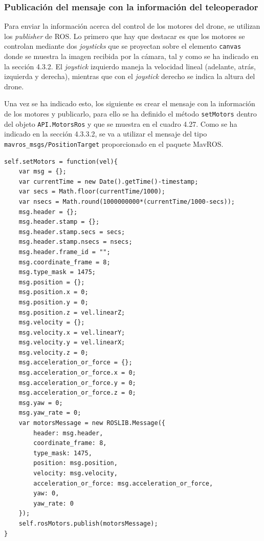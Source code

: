 \subsubsection{Publicación del mensaje con la información del teleoperador}

Para enviar la información acerca del control de los motores del drone, se utilizan los \textit{publisher} de ROS. Lo primero que hay que destacar es que los motores se controlan mediante dos \textit{joysticks} que se proyectan sobre el elemento \texttt{canvas} donde se muestra la imagen recibida por la cámara, tal y como se ha indicado en la sección 4.3.2. El \textit{joystick} izquierdo maneja la velocidad lineal (adelante, atrás, izquierda y derecha), mientras que con el \textit{joystick} derecho se indica la altura del drone.

Una vez se ha indicado esto, los siguiente es crear el mensaje con la información de los motores y publicarlo, para ello se ha definido el método \texttt{setMotors} dentro del objeto \texttt{API.MotorsRos} y que se muestra en el cuadro 4.27. Como se ha indicado en la sección 4.3.3.2, se va a utilizar el mensaje del tipo \texttt{mavros\_msgs/PositionTarget} proporcionado en el paquete MavROS.

\begin{lstlisting}[caption= Publicar el mensaje con la información del teleoperador, label=cod.publishetmotors]
self.setMotors = function(vel){
	var msg = {};
	var currentTime = new Date().getTime()-timestamp;
	var secs = Math.floor(currentTime/1000);
	var nsecs = Math.round(1000000000*(currentTime/1000-secs));
	msg.header = {};
	msg.header.stamp = {};
	msg.header.stamp.secs = secs;
	msg.header.stamp.nsecs = nsecs;
	msg.header.frame_id = "";
	msg.coordinate_frame = 8;
	msg.type_mask = 1475;
	msg.position = {};
	msg.position.x = 0;
	msg.position.y = 0;
	msg.position.z = vel.linearZ;
	msg.velocity = {};
	msg.velocity.x = vel.linearY;
	msg.velocity.y = vel.linearX;
	msg.velocity.z = 0;
	msg.acceleration_or_force = {};
	msg.acceleration_or_force.x = 0;
	msg.acceleration_or_force.y = 0;
	msg.acceleration_or_force.z = 0;
	msg.yaw = 0;
	msg.yaw_rate = 0;
	var motorsMessage = new ROSLIB.Message({
		header: msg.header,
		coordinate_frame: 8,
		type_mask: 1475,
		position: msg.position,
		velocity: msg.velocity,
		acceleration_or_force: msg.acceleration_or_force,
		yaw: 0,
		yaw_rate: 0
	});
	self.rosMotors.publish(motorsMessage);
}
\end{lstlisting}

